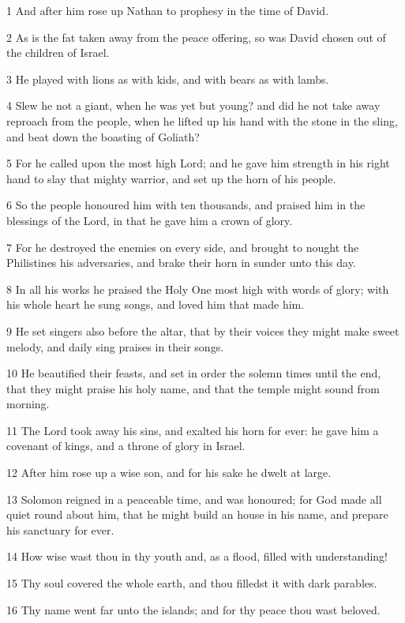 \par 1 And after him rose up Nathan to prophesy in the time of David.
\par 2 As is the fat taken away from the peace offering, so was David chosen out of the children of Israel.
\par 3 He played with lions as with kids, and with bears as with lambs.
\par 4 Slew he not a giant, when he was yet but young? and did he not take away reproach from the people, when he lifted up his hand with the stone in the sling, and beat down the boasting of Goliath?
\par 5 For he called upon the most high Lord; and he gave him strength in his right hand to slay that mighty warrior, and set up the horn of his people.
\par 6 So the people honoured him with ten thousands, and praised him in the blessings of the Lord, in that he gave him a crown of glory.
\par 7 For he destroyed the enemies on every side, and brought to nought the Philistines his adversaries, and brake their horn in sunder unto this day.
\par 8 In all his works he praised the Holy One most high with words of glory; with his whole heart he sung songs, and loved him that made him.
\par 9 He set singers also before the altar, that by their voices they might make sweet melody, and daily sing praises in their songs.
\par 10 He beautified their feasts, and set in order the solemn times until the end, that they might praise his holy name, and that the temple might sound from morning.
\par 11 The Lord took away his sins, and exalted his horn for ever: he gave him a covenant of kings, and a throne of glory in Israel.
\par 12 After him rose up a wise son, and for his sake he dwelt at large.
\par 13 Solomon reigned in a peaceable time, and was honoured; for God made all quiet round about him, that he might build an house in his name, and prepare his sanctuary for ever.
\par 14 How wise wast thou in thy youth and, as a flood, filled with understanding!
\par 15 Thy soul covered the whole earth, and thou filledst it with dark parables.
\par 16 Thy name went far unto the islands; and for thy peace thou wast beloved.
